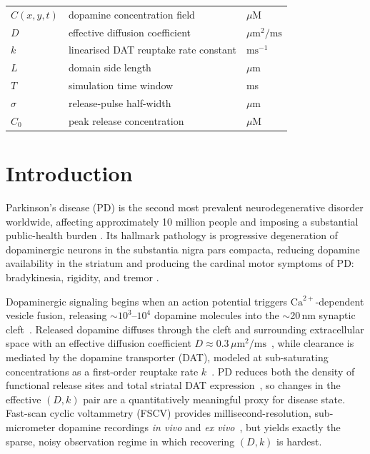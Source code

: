 \documentclass[12pt]{article}
\begin{document}
\begin{tabular}{@{}lll@{}}
$C(x,y,t)$ & dopamine concentration field & $\mu$M \\
$D$        & effective diffusion coefficient & $\mu\text{m}^2/\text{ms}$ \\
$k$        & linearised DAT reuptake rate constant & $\text{ms}^{-1}$ \\
$L$        & domain side length & $\mu$m \\
$T$        & simulation time window & ms \\
$\sigma$   & release-pulse half-width & $\mu$m \\
$C_0$      & peak release concentration & $\mu$M \\
\end{tabular}

\section{Introduction}
\label{sec:intro}

Parkinson's disease (PD) is the second most prevalent
neurodegenerative disorder worldwide, affecting approximately
10 million people and imposing a substantial public-health
burden \cite{GBD2016}. Its hallmark pathology is progressive
degeneration of dopaminergic neurons in the substantia nigra
pars compacta, reducing dopamine availability in the striatum
and producing the cardinal motor symptoms of PD: bradykinesia,
rigidity, and tremor \cite{Hornykiewicz1966, DeLong2007}.

Dopaminergic signaling begins when an action potential triggers
$\text{Ca}^{2+}$-dependent vesicle fusion, releasing
$\sim$$10^3$--$10^4$ dopamine molecules into the
$\sim$20\,nm synaptic cleft~\cite{Wiencke2020}. Released
dopamine diffuses through the cleft and surrounding
extracellular space with an effective diffusion coefficient
$D \approx 0.3\,\mu\text{m}^2/\text{ms}$~\cite{Nicholson1981,
CraggRice2004}, while clearance is mediated by the dopamine
transporter (DAT), modeled at sub-saturating concentrations as
a first-order reuptake rate $k$~\cite{CraggRice2004}. PD reduces
both the density of functional release sites and total striatal
DAT expression~\cite{Rice2008, CraggRice2004}, so changes in the
effective $(D, k)$ pair are a quantitatively meaningful proxy for
disease state. Fast-scan cyclic voltammetry (FSCV) provides
millisecond-resolution, sub-micrometer dopamine recordings
\emph{in vivo} and \emph{ex vivo}~\cite{Rodeberg2017}, but
yields exactly the sparse, noisy observation regime in which
recovering $(D, k)$ is hardest.
\end{document}
